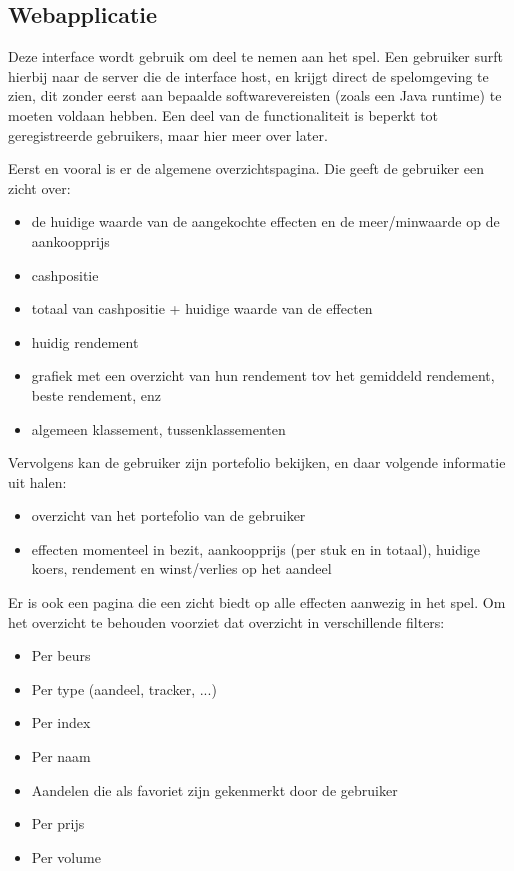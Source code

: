 \subsection{Webapplicatie}

Deze interface wordt gebruik om deel te nemen aan het spel. Een gebruiker surft hierbij naar de server die de interface host, en krijgt direct de spelomgeving te zien, dit zonder eerst aan bepaalde softwarevereisten (zoals een Java runtime) te moeten voldaan hebben. Een deel van de functionaliteit is beperkt tot geregistreerde gebruikers, maar hier meer over later.

Eerst en vooral is er de algemene overzichtspagina. Die geeft de gebruiker een zicht over:
\begin{itemize}
\item{de huidige waarde van de aangekochte effecten en de meer/minwaarde op de aankoopprijs}
\item{cashpositie}
\item{totaal van cashpositie + huidige waarde van de effecten}
\item{huidig rendement}
\item{grafiek met een overzicht van hun rendement tov het gemiddeld rendement, beste rendement, enz}
\item{algemeen klassement, tussenklassementen}
\end{itemize}

Vervolgens kan de gebruiker zijn portefolio bekijken, en daar volgende informatie uit halen:
\begin{itemize}
\item{overzicht van het portefolio van de gebruiker}
\item{effecten momenteel in bezit, aankoopprijs (per stuk en in totaal), huidige koers, rendement en winst/verlies op het aandeel}
\end{itemize}

Er is ook een pagina die een zicht biedt op alle effecten aanwezig in het spel. Om het overzicht te behouden voorziet dat overzicht in verschillende filters:
\begin{itemize}
\item{Per beurs}
\item{Per type (aandeel, tracker, ...)}
\item{Per index}
\item{Per naam}
\item{Aandelen die als favoriet zijn gekenmerkt door de gebruiker}
\item{Per prijs}
\item{Per volume}
\end{itemize}

